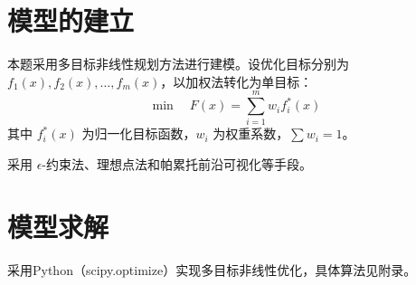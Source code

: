 \section{模型的建立}

本题采用多目标非线性规划方法进行建模。设优化目标分别为 $f_1(x),f_2(x),\ldots,f_m(x)$，以加权法转化为单目标：
\[\min \quad F(x) = \sum_{i=1}^m w_i f_i^*(x)\]
其中 $f_i^*(x)$ 为归一化目标函数，$w_i$ 为权重系数，$\sum w_i=1$。

采用 $\epsilon$-约束法、理想点法和帕累托前沿可视化等手段。

\section{模型求解}

采用Python（scipy.optimize）实现多目标非线性优化，具体算法见附录。